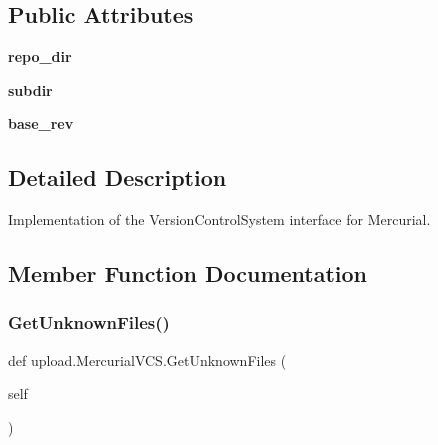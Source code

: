 \subsection*{Public Attributes}
\begin{DoxyCompactItemize}
\item 
\mbox{\label{classupload_1_1MercurialVCS_a219c1e0ab9ce864e3231913762ea489b}} 
{\bfseries repo\+\_\+dir}
\item 
\mbox{\label{classupload_1_1MercurialVCS_a0dad32e621f5523e3430d867184f0b42}} 
{\bfseries subdir}
\item 
\mbox{\label{classupload_1_1MercurialVCS_a41faae7820d5a015f4a42476e5e4ab8c}} 
{\bfseries base\+\_\+rev}
\end{DoxyCompactItemize}


\subsection{Detailed Description}
\begin{DoxyVerb}Implementation of the VersionControlSystem interface for Mercurial.\end{DoxyVerb}
 

\subsection{Member Function Documentation}
\mbox{\label{classupload_1_1MercurialVCS_a6190899fb86cd09ad84cc5d4b0ebd2f3}} 
\subsubsection{\texorpdfstring{Get\+Unknown\+Files()}{GetUnknownFiles()}\hspace{0.1cm}{\footnotesize\ttfamily [1/2]}}
{\footnotesize\ttfamily def upload.\+Mercurial\+V\+C\+S.\+Get\+Unknown\+Files (\begin{DoxyParamCaption}\item[{}]{self }\end{DoxyParamCaption})}

